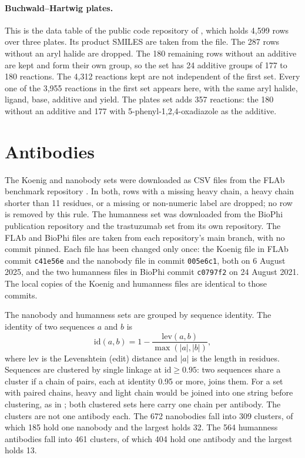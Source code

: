 \paragraph{Buchwald--Hartwig plates.} This is the data table of the public code repository of \citet{Ahneman2018}, which holds 4,599 rows over three plates. Its product SMILES are taken from the file. The 287 rows without an aryl halide are dropped. The 180 remaining rows without an additive are kept and form their own group, so the set has 24 additive groups of 177 to 180 reactions. The 4,312 reactions kept are not independent of the first set. Every one of the 3,955 reactions in the first set appears here, with the same aryl halide, ligand, base, additive and yield. The plates set adds 357 reactions: the 180 without an additive and 177 with 5-phenyl-1,2,4-oxadiazole as the additive.

\section{Antibodies}\label{app:datasets:antibodies}

The Koenig and nanobody sets were downloaded as CSV files from the FLAb benchmark repository \citep{Chungyoun2024}. In both, rows with a missing heavy chain, a heavy chain shorter than 11 residues, or a missing or non-numeric label are dropped; no row is removed by this rule. The humanness set was downloaded from the BioPhi publication repository and the trastuzumab set from its own repository. The FLAb and BioPhi files are taken from each repository's main branch, with no commit pinned. Each file has been changed only once: the Koenig file in FLAb commit \texttt{c41e56e} and the nanobody file in commit \texttt{005e6c1}, both on 6 August 2025, and the two humanness files in BioPhi commit \texttt{c0797f2} on 24 August 2021. The local copies of the Koenig and humanness files are identical to those commits.

The nanobody and humanness sets are grouped by sequence identity. The identity of two sequences $a$ and $b$ is
\begin{equation}
\mathrm{id}(a,b) = 1 - \frac{\mathrm{lev}(a,b)}{\max(|a|,|b|)},
\end{equation}
where $\mathrm{lev}$ is the Levenshtein (edit) distance and $|a|$ is the length in residues. Sequences are clustered by single linkage at $\mathrm{id} \ge 0.95$: two sequences share a cluster if a chain of pairs, each at identity 0.95 or more, joins them. For a set with paired chains, heavy and light chain would be joined into one string before clustering, as in \citet{Kenlay2024}; both clustered sets here carry one chain per antibody. The clusters are not one antibody each. The 672 nanobodies fall into 309 clusters, of which 185 hold one nanobody and the largest holds 32. The 564 humanness antibodies fall into 461 clusters, of which 404 hold one antibody and the largest holds 13.

